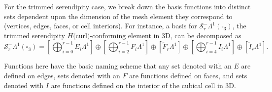 \documentclass[manuscript,screen]{acmart}
\newcommand\josh[1]{\textbf{\textcolor[rgb]{0,.5,1}{[Josh: #1]}}}
\newcommand{\calS}{\mathcal{S}}
\begin{document}
  
 For the trimmed serendipity case, we break down the basis functions into distinct sets dependent upon the dimension of the mesh element they correspond to (vertices, edges, faces, or cell interiors).  For instance, a basis for $\calS^-_r\Lambda^1(\square_3)$, the trimmed serendipity $H($curl$)$-conforming element in 3D, can be decomposed as
   \begin{equation}\label{eq:HCurlTrimmedSerendipityBasis}
   \calS^-_r\Lambda^1(\square_3) =    \left[\bigoplus_{i=0}^{r-1} E_i \Lambda^1\right]\oplus\left[ \bigoplus_{i=2}^{r-1}F_i \Lambda^1\right] \oplus \left[\tilde{F}_r \Lambda^1\right]\oplus\left[ \bigoplus_{i=4}^{r-1}I_i \Lambda^1 \right] \oplus \left[\tilde{I}_r \Lambda^1\right].
   \end{equation}
   
  \noindent Functions here have the basic naming scheme that any set denoted with an $E$ are defined on edges, sets denoted with an $F$ are functions defined on faces, and sets denoted with $I$ are functions defined on the interior of the cubical cell in 3D.
  
\end{document}
